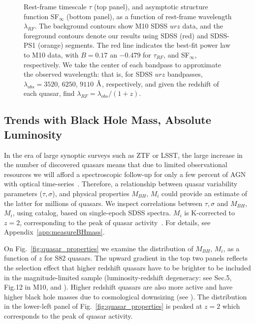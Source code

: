 \documentclass[twocolumn]{aastex62}
\let\oldAA\AA
\renewcommand{\AA}{\text{\normalfont\oldAA}}
\begin{document}
  
\begin{figure} %
\caption{Rest-frame timescale $\tau$ (top panel), and asymptotic structure function SF$_{\infty}$ (bottom panel), as a function of rest-frame wavelength $\lambda_{RF}$. The background contours show M10 SDSS $ urz $  data, and the foreground contours  denote our results using  SDSS (red) and SDSS-PS1 (orange) segments. The red line indicates the best-fit power law to M10 data, with $B=0.17$ an $-0.479$ for $\tau_{RF}$, and SF$_{\infty}$, respectively. We take the center of each bandpass to approximate the  observed wavelength: that is, for SDSS $urz$ bandpasses,  $\lambda_{obs} = 3520$, $6250$, $9110$ $\mbox{\AA}$, respectively, and given the redshift of each quasar, find $\lambda_{RF}=\lambda_{obs} / (1+z)$.}
\label{fig:lambda_dependence}
\end{figure} 




\subsection{Trends with Black Hole Mass, Absolute Luminosity}

In the era of large synoptic surveys such as ZTF or LSST, the large increase in the number of discovered quasars means that due to limited observational resources we will afford a spectroscopic follow-up for only a few percent of AGN with optical time-series~\citep{ivezic2019}. Therefore, a relationship between quasar variability parameters ($\tau, \sigma$), and physical properties $M_{BH}$, $M_{i}$ could provide an estimate of the latter for millions of quasars. We inspect correlations between $\tau, \sigma$  and $M_{BH}$, $M_{i}$, using \cite{shen2011} catalog, based on single-epoch SDSS spectra. $M_{i}$ is K-corrected to  $z= 2$, corresponding to the peak of quasar activity~\citep{richards2006a}. For details, see Appendix~\ref{app:measureBHmass}.

On Fig.~\ref{fig:quasar_properties} we examine the distribution of $M_{BH}$, $M_{i}$, as a function of $z$ for S82 quasars. The upward gradient in the top two panels reflects the selection effect that higher redshift quasars have to be brighter to be included in the magnitude-limited sample (luminosity-redshift degeneracy: see Sec.5, Fig.12 in M10, and \citealt{dong2018}). Higher redshift quasars are also more active  and have higher black hole masses due to cosmological downsizing (see \citealt{babic2007,labita2009, mclure2004}). The distribution in the lower-left panel of Fig.~\ref{fig:quasar_properties} is peaked at $z=2$ which corresponds to the peak of quasar activity. 
\end{document}
